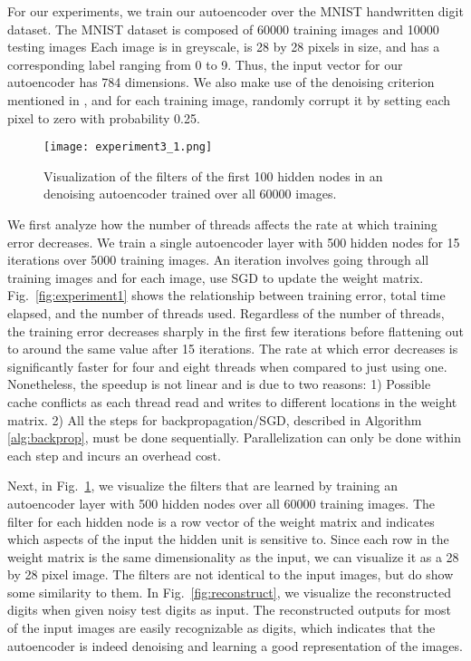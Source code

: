 

For our experiments, we train our autoencoder over the MNIST handwritten digit
dataset. The MNIST dataset is composed of 60000 training images and 10000
testing images Each image is in greyscale, is 28 by 28 pixels in size, and has
a corresponding label ranging from 0 to 9. Thus, the input vector for our
autoencoder has 784 dimensions. We also make use of the denoising criterion
mentioned in \cite{vincent2010stacked}, and for each training image, randomly
corrupt it by setting each pixel to zero with probability 0.25. 

\begin{figure}[h] \centering
	\texttt{[image: experiment3\_1.png]}
	\caption{Visualization of the filters of the first 100 hidden nodes in an
	denoising autoencoder trained over all 60000 images.}
	\label{fig:experiment3_1}
\end{figure}



We first analyze how the number of threads affects the rate at which training
error decreases. We train a single autoencoder layer with 500 hidden nodes for
15 iterations over 5000 training images. An iteration involves going through
all training images and for each image, use SGD to update the weight matrix.
Fig.~\ref{fig:experiment1} shows the relationship between training error, total
time elapsed, and the number of threads used. Regardless of the number of
threads, the training error decreases sharply in the first few iterations
before flattening out to around the same value after 15 iterations. The rate at
which error decreases is significantly faster for four and eight threads when
compared to just using one. Nonetheless, the speedup is not linear and is due
to two reasons: 1) Possible cache conflicts as each thread read and writes to
different locations in the weight matrix. 2) All the steps for
backpropagation/SGD, described in Algorithm \ref{alg:backprop}, must be done
sequentially. Parallelization can only be done within each step and incurs an
overhead cost.


Next, in Fig.~\ref{fig:experiment3_1}, we visualize the filters that are
learned by training an autoencoder layer with 500 hidden nodes over all 60000
training images. The  filter for each hidden node is a row vector of the weight
matrix and indicates which aspects of the input the hidden unit is sensitive
to. Since each row in the weight matrix is the same dimensionality as the
input, we can visualize it as a 28 by 28 pixel image. The filters are not
identical to the input images, but do show some similarity to them. In
Fig.~\ref{fig:reconstruct}, we visualize the reconstructed digits when given
noisy test digits as input. The reconstructed outputs for most of the input
images are easily recognizable as digits, which indicates that the autoencoder
is indeed denoising and learning a good representation of the images.

